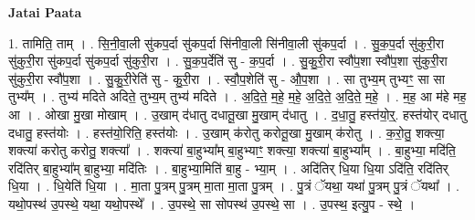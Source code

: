 \documentclass[17pt]{extarticle}
\begin{document}
\textbf{Jatai Paata} \newline

1. तामिति॒ ताम् । . सि॒नी॒वा॒ली सु॑कप॒र्दा सु॑कप॒र्दा सि॑नीवा॒ली सि॑नीवा॒ली सु॑कप॒र्दा । . सु॒क॒प॒र्दा सु॑कुरी॒रा सु॑कुरी॒रा सु॑कप॒र्दा सु॑कप॒र्दा सु॑कुरी॒रा । . सु॒क॒प॒र्देति॑ सु - क॒प॒र्दा । . सु॒कु॒री॒रा स्वौ॑प॒शा स्वौ॑प॒शा सु॑कुरी॒रा सु॑कुरी॒रा स्वौ॑प॒शा । . सु॒कु॒री॒रेति॑ सु - कु॒री॒रा । . स्वौ॒प॒शेति॑ सु - औ॒प॒शा । . सा तुभ्य॒म् तुभ्यꣳ॒॒ सा सा तुभ्य᳚म् । . तुभ्य॑ मदिते अदिते॒ तुभ्य॒म् तुभ्य॑ मदिते । . अ॒दि॒ते॒ म॒हे॒ म॒हे॒ अ॒दि॒ते॒ अ॒दि॒ते॒ म॒हे॒ । . म॒ह॒ आ म॑हे मह॒ आ । . ओखा मु॒खा मोखाम् । . उ॒खाम् द॑धातु दधातू॒खा मु॒खाम् द॑धातु । . द॒धा॒तु॒ हस्त॑यो॒र्॒. हस्त॑योर् दधातु दधातु॒ हस्त॑योः । . हस्त॑यो॒रिति॒ हस्त॑योः । . उ॒खाम् क॑रोतु करोतू॒खा मु॒खाम् क॑रोतु । . क॒रो॒तु॒ शक्त्या॒ शक्त्या॑ करोतु करोतु॒ शक्त्या᳚ । . शक्त्या॑ बा॒हुभ्या᳚म् बा॒हुभ्याꣳ॒॒ शक्त्या॒ शक्त्या॑ बा॒हुभ्या᳚म् । . बा॒हुभ्या॒ मदि॑ति॒ रदि॑तिर् बा॒हुभ्या᳚म् बा॒हुभ्या॒ मदि॑तिः । . बा॒हुभ्या॒मिति॑ बा॒हु - भ्या॒म् । . अदि॑तिर् धि॒या धि॒या ऽदि॑ति॒ रदि॑तिर् धि॒या । . धि॒येति॑ धि॒या । . मा॒ता पु॒त्रम् पु॒त्रम् मा॒ता मा॒ता पु॒त्रम् । . पु॒त्रं ॅयथा॒ यथा॑ पु॒त्रम् पु॒त्रं ॅयथा᳚ । . यथो॒पस्थ॑ उ॒पस्थे॒ यथा॒ यथो॒पस्थे᳚ । . उ॒पस्थे॒ सा सोपस्थ॑ उ॒पस्थे॒ सा । . उ॒पस्थ॒ इत्यु॒प - स्थे॒ । \newline
\end{document}
